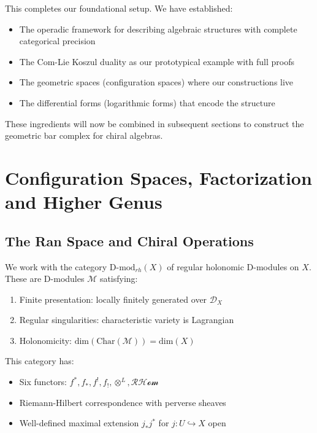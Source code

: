 This completes our foundational setup. We have established:
\begin{itemize}
\item The operadic framework for describing algebraic structures with complete categorical precision
\item The Com-Lie Koszul duality as our prototypical example with full proofs
\item The geometric spaces (configuration spaces) where our constructions live
\item The differential forms (logarithmic forms) that encode the structure
\end{itemize}
 
These ingredients will now be combined in subsequent sections to construct the geometric bar complex for chiral algebras.
 
\section{Configuration Spaces, Factorization and Higher Genus}
 
\subsection{The Ran Space and Chiral Operations}

\begin{definition}
We work with the category $\text{D-mod}_{rh}(X)$ of regular holonomic D-modules on $X$. 
These are D-modules $\mathcal{M}$ satisfying:
\begin{enumerate}
\item Finite presentation: locally finitely generated over $\mathcal{D}_X$
\item Regular singularities: characteristic variety is Lagrangian
\item Holonomicity: $\text{dim}(\text{Char}(\mathcal{M})) = \text{dim}(X)$
\end{enumerate}
This category has:
\begin{itemize}
\item Six functors: $f^*, f_*, f^!, f_!, \otimes^L, \mathcal{RHom}$
\item Riemann-Hilbert correspondence with perverse sheaves
\item Well-defined maximal extension $j_*j^*$ for $j: U \hookrightarrow X$ open
\end{itemize}
\end{definition}

